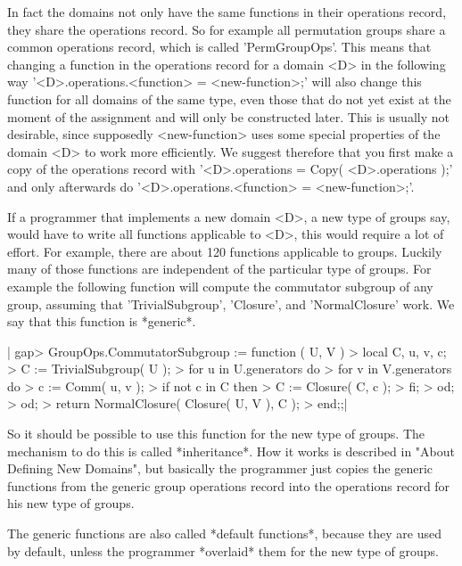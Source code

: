 In fact the domains not only have  the same functions in their operations
record, they share the operations record.  So for example all permutation
groups share a  common operations record, which is called 'PermGroupOps'.
This means that changing a function in the operations record for a domain
<D> in the following  way '<D>.operations.<function> \:= <new-function>;'
will  also change this function for  all domains  of  the same type, even
those that do not yet exist at the moment of the assignment and will only
be constructed later.   This  is  usually not desirable, since supposedly
<new-function>  uses  some  special  properties of the domain <D> to work
more efficiently.  We suggest therefore that you first make a copy of the
operations record with '<D>.operations \:= Copy(  <D>.operations );'  and
only afterwards do '<D>.operations.<function> \:= <new-function>;'.

If a programmer that  implements a new domain <D>,  a  new type of groups
say, would have  to write all  functions  applicable  to  <D>, this would
require a lot  of  effort.   For example,  there are about 120  functions
applicable to groups.  Luckily many of those functions are independent of
the  particular type of groups.  For example the following function  will
compute  the   commutator   subgroup   of   any   group,  assuming   that
'TrivialSubgroup', 'Closure', and 'NormalClosure' work.  We say that this
function is *generic*.

|    gap> GroupOps.CommutatorSubgroup := function ( U, V )
    >     local   C, u, v, c;
    >     C := TrivialSubgroup( U );
    >     for u  in U.generators  do
    >         for v  in V.generators  do
    >             c := Comm( u, v );
    >             if not c in C  then
    >                 C := Closure( C, c );
    >             fi;
    >         od;
    >     od;
    >     return NormalClosure( Closure( U, V ), C );
    > end;;|

So it should be possible to use this function for the new type of groups.
The mechanism  to do  this is  called *inheritance*.   How  it  works  is
described in "About  Defining  New Domains", but basically the programmer
just  copies the generic  functions from  the  generic  group  operations
record into the operations record for his new type of groups.

The generic functions  are also called  *default functions*, because they
are used by  default, unless the  programmer  *overlaid* them for the new
type of groups.

